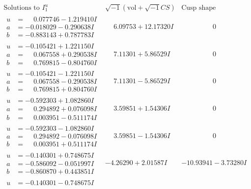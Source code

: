 \documentclass[1p]{elsarticle_modified}
\theoremstyle{definition}
\newcommand{\I}{\sqrt{-1}}
\begin{document}
$$\begin{array}{c|c|c}
\text{Solutions to }I^u_{1}& \I (\text{vol} + \sqrt{-1}CS) & \text{Cusp shape}\\
 \hline 
\begin{aligned}
u &= \phantom{-}0.077746 - 1.219410 I \\
a &= -0.018029 - 0.290638 I \\
b &= -0.883143 + 0.787783 I\end{aligned}
 & \phantom{-}6.09753 + 12.17320 I & \phantom{-0.000000 } 0 \\ \hline\begin{aligned}
u &= -0.105421 + 1.221150 I \\
a &= \phantom{-}0.067558 + 0.290538 I \\
b &= \phantom{-}0.769815 - 0.804760 I\end{aligned}
 & \phantom{-}7.11301 + 5.86529 I & \phantom{-0.000000 } 0 \\ \hline\begin{aligned}
u &= -0.105421 - 1.221150 I \\
a &= \phantom{-}0.067558 - 0.290538 I \\
b &= \phantom{-}0.769815 + 0.804760 I\end{aligned}
 & \phantom{-}7.11301 - 5.86529 I & \phantom{-0.000000 } 0 \\ \hline\begin{aligned}
u &= -0.592303 + 1.082860 I \\
a &= \phantom{-}0.294892 + 0.076098 I \\
b &= \phantom{-}0.003951 - 0.511174 I\end{aligned}
 & \phantom{-}3.59851 + 1.54306 I & \phantom{-0.000000 } 0 \\ \hline\begin{aligned}
u &= -0.592303 - 1.082860 I \\
a &= \phantom{-}0.294892 - 0.076098 I \\
b &= \phantom{-}0.003951 + 0.511174 I\end{aligned}
 & \phantom{-}3.59851 - 1.54306 I & \phantom{-0.000000 } 0 \\ \hline\begin{aligned}
u &= -0.140301 + 0.748675 I \\
a &= -0.586092 - 0.051997 I \\
b &= -0.860870 + 0.443851 I\end{aligned}
 & -4.26290 + 2.01587 I & -10.93941 - 3.73280 I \\ \hline\begin{aligned}
u &= -0.140301 - 0.748675 I \\

\end{aligned}
\end{array}$$
\end{document}
